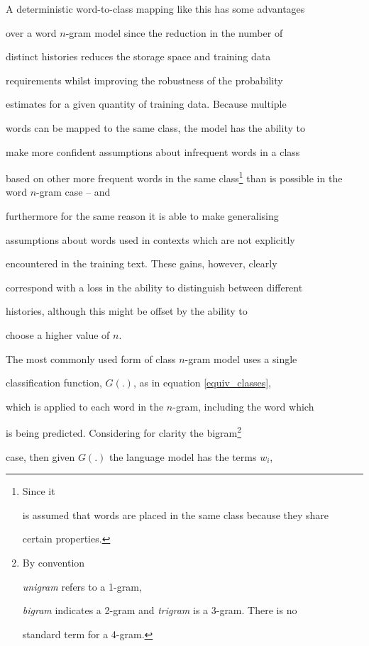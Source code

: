A deterministic word-to-class mapping like this has some advantages


over a word $n$-gram model since the reduction in the number of


distinct histories reduces the storage space and training data


requirements whilst improving the robustness of the probability


estimates for a given quantity of training data. Because multiple


words can be mapped to the same class, the model has the ability to


make more confident assumptions about infrequent words in a class


based on other more frequent words in the same class\footnote{Since it


is assumed that words are placed in the same class because they share


certain properties.} than is possible in the word $n$-gram case -- and


furthermore for the same reason it is able to make generalising


assumptions about words used in contexts which are not explicitly


encountered in the training text. These gains, however, clearly


correspond with a loss in the ability to distinguish between different


histories, although this might be offset by the ability to


choose a higher value of $n$.





The most commonly used form of class $n$-gram model uses a single


classification function, $G(.)$, as in equation \ref{equiv_classes},


which is applied to each word in the $n$-gram, including the word which


is being predicted. Considering for clarity the bigram\footnote{By convention


{\it unigram} refers to a 1-gram,


{\it bigram} indicates a 2-gram and {\it trigram} is a 3-gram. There is no


standard term for a 4-gram.}


case, then given $G(.)$ the language model has the terms $w_i$,


